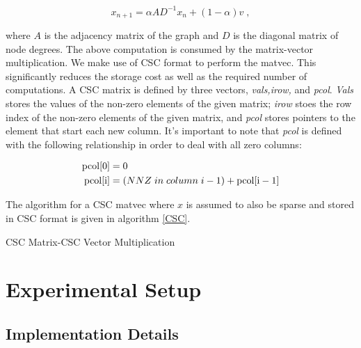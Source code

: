 \documentclass[11pt]{article}
\newcommand{\noi}{\noindent}
\begin{document}
\begin{equation*}
	x_{n+1} = \alpha AD^{-1}x_{n}+(1-\alpha)v \; , 
\end{equation*}

\noi where $A$ is the adjacency matrix of the graph and $D$ is the diagonal
matrix of node degrees. The above computation is consumed by the matrix-vector
multiplication. We make use of CSC format to perform the matvec. This
significantly reduces the storage cost as well as the required number of
computations. A CSC matrix is defined by three vectors, \textit{vals,irow,} and
\textit{pcol}. \textit{Vals} stores the values of the non-zero elements of the
given matrix; \textit{irow} stoes the row index of the non-zero elements of the
given matrix, and \textit{pcol} stores pointers to the element that start each
new column. It's important to note that \textit{pcol} is defined with the
following relationship in order to deal with all zero columns: 

\begin{equation*}
	\begin{split}
		\rm{pcol}[0] &= 0\\
		\rm{pcol}[i] &=
		(NNZ\;in\;column\;i-1)
		+ \rm{pcol}[i-1]
	\end{split}
\end{equation*}

The algorithm for a CSC matvec where $x$ is assumed to also be
sparse and stored in CSC format is given in algorithm \ref{CSC}.

\begin{algorithm}[H]
\caption{CSC Matrix-CSC Vector Multiplication}\label{CSC}
\begin{algorithmic}[1]
\EndFor
\EndParFor
{}
\EndProcedure
\end{algorithmic}
\end{algorithm}

\section{Experimental Setup}
\subsection{Implementation Details}
\end{document}
